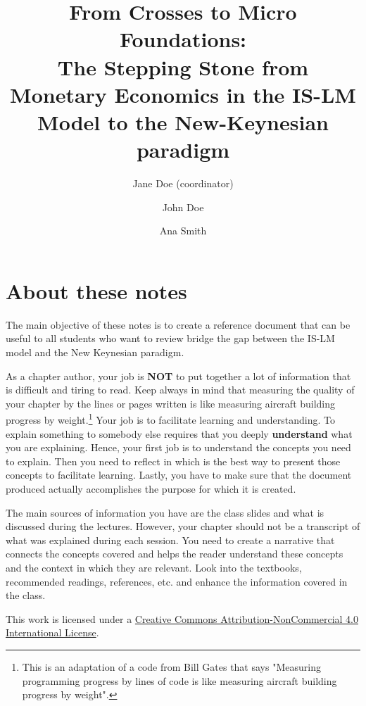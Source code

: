 \documentclass[11pt,a4paper,oneside]{book}
\title{From Crosses to Micro Foundations:\\
The Stepping Stone from Monetary Economics in the IS-LM Model to the New-Keynesian paradigm}
\author{
  Jane Doe (coordinator)
  \and
  John Doe
  \and
  Ana Smith
}
\begin{document}
\frontmatter
\maketitle

\chapter{About these notes}
The main objective of these notes is to create a reference document that can be useful to all students who want to review bridge the gap between the IS-LM model and the New Keynesian paradigm.

As a chapter author, your job is \textbf{NOT} to put together a lot of information that is difficult and tiring to read. Keep always in mind that measuring the quality of your chapter by the lines or pages written is like measuring aircraft building progress by weight.\footnote{This is an adaptation of a code from Bill Gates that says "Measuring programming progress by lines of code is like measuring aircraft building progress by weight".} Your job is to facilitate learning and understanding. To explain something to somebody else requires that you deeply \textbf{understand} what you are explaining. Hence, your first job is to understand the concepts you need to explain. Then you need to reflect in which is the best way to present those concepts to facilitate learning. Lastly, you have to make sure that the document produced actually accomplishes the purpose for which it is created.

The main sources of information you have are the class slides and what is discussed during the lectures. However, your chapter should not be a transcript of what was explained during each session. You need to create a narrative that connects the concepts covered and helps the reader understand these concepts and the context in which they are relevant. Look into the textbooks, recommended readings, references, etc. and enhance the information covered in the class.

This work is licensed under a \href{http://creativecommons.org/licenses/by-nc/4.0/}{Creative Commons Attribution-NonCommercial 4.0 International License}.

\tableofcontents
\listoffigures
\listoftables

\mainmatter
\end{document}
